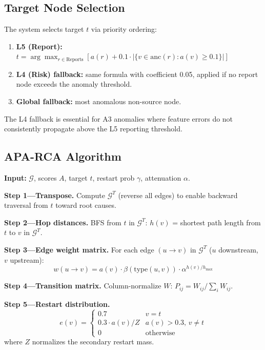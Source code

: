 \documentclass{article}
\begin{document}
\subsection{Target Node Selection}

The system selects target $t$ via priority ordering:
\begin{enumerate}
  \item \textbf{L5 (Report):} $t = \arg\max_{r \in \mathrm{Reports}}
        [a(r) + 0.1 \cdot |\{v \in \mathrm{anc}(r) : a(v) \ge 0.1\}|]$
  \item \textbf{L4 (Risk) fallback:} same formula with coefficient 0.05,
        applied if no report node exceeds the anomaly threshold.
  \item \textbf{Global fallback:} most anomalous non-source node.
\end{enumerate}
The L4 fallback is essential for A3 anomalies where feature errors do not
consistently propagate above the L5 reporting threshold.

\subsection{APA-RCA Algorithm}
\label{sec:algorithm}

\textbf{Input:} $\mathcal{G}$, scores $A$, target $t$, restart prob $\gamma$,
attenuation $\alpha$.

\textbf{Step 1---Transpose.} Compute $\mathcal{G}^T$ (reverse all edges) to
enable backward traversal from $t$ toward root causes.

\textbf{Step 2---Hop distances.} BFS from $t$ in $\mathcal{G}^T$:
$h(v)$ = shortest path length from $t$ to $v$ in $\mathcal{G}^T$.

\textbf{Step 3---Edge weight matrix.} For each edge $(u \to v)$ in
$\mathcal{G}^T$ ($u$ downstream, $v$ upstream):
\begin{equation}
  w(u \to v) = a(v) \cdot \beta(\mathrm{type}(u,v)) \cdot
               \alpha^{h(v)/h_{\max}}
\end{equation}

\textbf{Step 4---Transition matrix.} Column-normalize $W$:
$P_{ij} = W_{ij} / \sum_i W_{ij}$.

\textbf{Step 5---Restart distribution.}
\begin{equation}
  e(v) = \begin{cases}
    0.7 & v = t \\
    0.3 \cdot a(v) / Z & a(v) > 0.3,\, v \neq t \\
    0 & \text{otherwise}
  \end{cases}
\end{equation}
where $Z$ normalizes the secondary restart mass.
\end{document}
